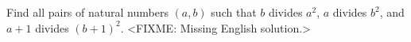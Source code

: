 \problem
Find all pairs of natural numbers $(a, b)$ such that $b$ divides $a^2$,
$a$ divides $b^2$, and $a + 1$ divides $(b + 1)^2$.
\solution
<FIXME: Missing English solution.>
\endproblem

